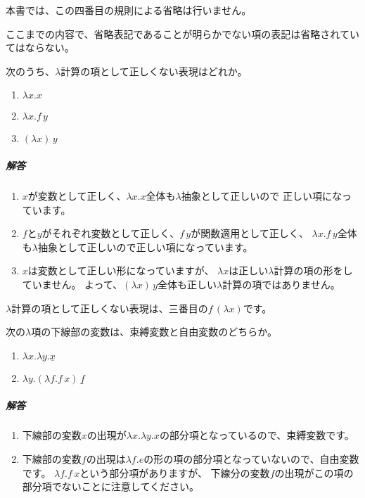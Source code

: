 本書では、この四番目の規則による省略は行いません。

\begin{note}
ここまでの内容で、省略表記であることが明らかでない項の表記は省略されていてはならない。
\end{note}

\begin{exercise}

次のうち、$\lambda$計算の項として正しくない表現はどれか。

\begin{enumerate}
  \item$\lambda x . x$
  \item$\lambda x . f \, y$
  \item$(\lambda x) \, y$
\end{enumerate}

\subparagraph{解答}

\begin{enumerate}
  \item $x$が変数として正しく、$\lambda x . x$全体も$\lambda$抽象として正しいので
        正しい項になっています。
  \item $f$と$y$がそれぞれ変数として正しく、$f \, y$が関数適用として正しく、
        $\lambda x . f \, y$全体も$\lambda$抽象として正しいので正しい項になっています。
  \item $x$は変数として正しい形になっていますが、
        $\lambda x$は正しい$\lambda$計算の項の形をしていません。
        よって、$(\lambda x) \, y$全体も正しい$\lambda$計算の項ではありません。
\end{enumerate}

$\lambda$計算の項として正しくない表現は、三番目の$f \, (\lambda x)$です。

\end{exercise}

\begin{exercise}

次の$\lambda$項の下線部の変数は、束縛変数と自由変数のどちらか。

\begin{enumerate}
  \item$\lambda x . \lambda y . \underline{x}$
  \item$\lambda y . (\lambda f . f \, x) \, \underline{f}$
\end{enumerate}

\subparagraph{解答}

\begin{enumerate}
  \item 下線部の変数$x$の出現が$\lambda x . \lambda y . x$の部分項となっているので、束縛変数です。
  \item 下線部の変数$f$の出現は$\lambda f . e$の形の項の部分項となっていないので、自由変数です。
       $\lambda f . f \, x$という部分項がありますが、
        下線分の変数$f$の出現がこの項の部分項でないことに注意してください。
\end{enumerate}

\end{exercise}

